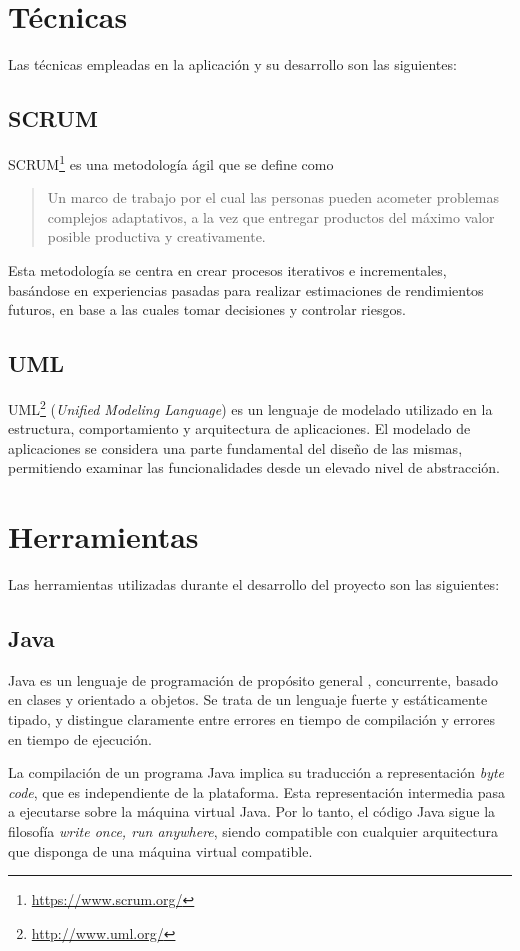 
\section{Técnicas}
Las técnicas empleadas en la aplicación y su desarrollo son las siguientes:

\subsection{SCRUM}
SCRUM\footnote{\url{https://www.scrum.org/}} es una metodología ágil que se define como \cite{scrum}
\begin{quote}
Un marco de trabajo por el cual las personas pueden acometer problemas complejos 
adaptativos, a la vez que entregar productos del máximo valor posible productiva y 
creativamente.
\end{quote}
Esta metodología se centra en crear procesos iterativos e incrementales, basándose en experiencias pasadas para realizar estimaciones de rendimientos futuros, en base a las cuales tomar decisiones y controlar riesgos.

\subsection{UML}
UML\footnote{\url{http://www.uml.org/}} (\emph{Unified Modeling Language}) es un lenguaje de modelado utilizado en la estructura, comportamiento y arquitectura de aplicaciones.
El modelado de aplicaciones se considera una parte fundamental del diseño de las mismas, permitiendo examinar las funcionalidades desde un elevado nivel de abstracción.

\section{Herramientas}
Las herramientas utilizadas durante el desarrollo del proyecto son las siguientes:

\subsection{Java}
Java es un lenguaje de programación de propósito general \cite{jls8}, concurrente, basado en clases y orientado a objetos.
Se trata de un lenguaje fuerte y estáticamente tipado, y distingue claramente entre errores en tiempo de compilación y errores en tiempo de ejecución.

La compilación de un programa Java implica su traducción a representación \emph{byte code}, que es independiente de la plataforma.
Esta representación intermedia pasa a ejecutarse sobre la máquina virtual Java.
Por lo tanto, el código Java sigue la filosofía \emph{write once, run anywhere}, siendo compatible con cualquier arquitectura que disponga de una máquina virtual compatible.

